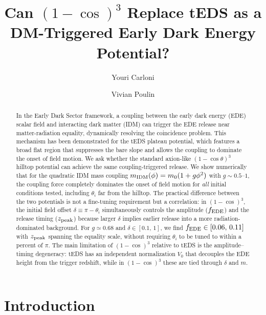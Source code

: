 \documentclass[aps,onecolumn,prd,nofootinbib,superscriptaddress,10pt,longbibliography,floatfix]{revtex4-2}
\newcommand{\fe}{f_{\rm EDE}}
\begin{document}
\title{Can $(1-\cos)^3$ Replace tEDS as a DM-Triggered Early Dark Energy Potential?}
\author{Youri Carloni}
\author{Vivian Poulin}

\begin{abstract}
In the Early Dark Sector framework, a coupling between the early dark energy (EDE) scalar field and interacting dark matter (IDM) can trigger the EDE release near matter-radiation equality, dynamically resolving the coincidence problem. This mechanism has been demonstrated for the tEDS plateau potential, which features a broad flat region that suppresses the bare slope and allows the coupling to dominate the onset of field motion. We ask whether the standard axion-like $(1-\cos\theta)^3$ hilltop potential can achieve the same coupling-triggered release. We show numerically that for the quadratic IDM mass coupling $m_{\rm IDM}(\phi)=m_0(1+g\phi^2)$ with $g\sim 0.5$--$1$, the coupling force completely dominates the onset of field motion for \emph{all} initial conditions tested, including $\theta_i$ far from the hilltop. The practical difference between the two potentials is not a fine-tuning requirement but a correlation: in $(1-\cos)^3$, the initial field offset $\delta\equiv\pi-\theta_i$ simultaneously controls the amplitude ($\fe$) and the release timing ($z_{\rm peak}$) because larger $\delta$ implies earlier release into a more radiation-dominated background. For $g\simeq 0.68$ and $\delta\in[0.1,\,1]$, we find $\fe \in [0.06,\,0.11]$ with $z_{\rm peak}$ spanning the equality scale, without requiring $\theta_i$ to be tuned to within a percent of $\pi$. The main limitation of $(1-\cos)^3$ relative to tEDS is the amplitude--timing degeneracy: tEDS has an independent normalization $V_0$ that decouples the EDE height from the trigger redshift, while in $(1-\cos)^3$ these are tied through $\delta$ and $m$.
\end{abstract}

\maketitle

\section{Introduction}
\label{sec:intro}
\end{document}
